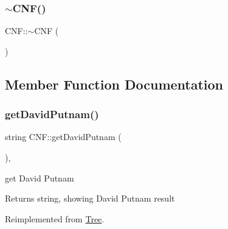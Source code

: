 \subsubsection{\texorpdfstring{$\sim$\+C\+N\+F()}{~CNF()}}
{\footnotesize\ttfamily C\+N\+F\+::$\sim$\+C\+NF (\begin{DoxyParamCaption}{ }\end{DoxyParamCaption})\hspace{0.3cm}{\ttfamily [override]}}



\subsection{Member Function Documentation}
\mbox{\label{class_c_n_f_a029535415f1d5cf92c8023693ce7b40e}} 
\subsubsection{\texorpdfstring{get\+David\+Putnam()}{getDavidPutnam()}\hspace{0.1cm}{\footnotesize\ttfamily [1/2]}}
{\footnotesize\ttfamily string C\+N\+F\+::get\+David\+Putnam (\begin{DoxyParamCaption}{ }\end{DoxyParamCaption})\hspace{0.3cm}{\ttfamily [override]}, {\ttfamily [virtual]}}



get David Putnam 

\begin{DoxyReturn}{Returns}
string, showing David Putnam result 
\end{DoxyReturn}


Reimplemented from \hyperlink{class_tree_a9d7b51cc207222de02ccb59192454de5}{Tree}.


